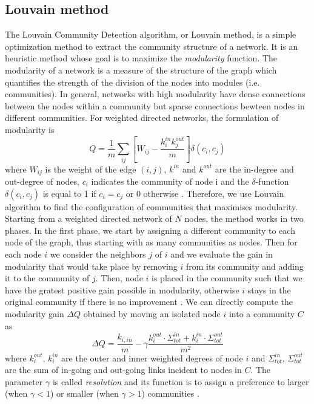 \subsection{Louvain method}

The Louvain Community Detection algorithm, or Louvain method, is a simple optimization method to extract the community structure of a network. It is an heuristic method whose goal is to maximize the \textit{modularity} function. The modularity of a network is a measure of the structure of the graph which quantifies the strength of the division of the nodes into modules (i.e. communities). In general, networks with high modularity have dense connections between the nodes within a community but sparse connections bewteen nodes in different communities.
For weighted directed networks, the formulation of modularity is 
\[
    Q = \frac{1}{m} \sum_{ij} \left[ W_{ij} - \frac{k_i^{in}k_j^{out}}{m} \right] \delta(c_i,c_j)
\]
where $W_{ij}$ is the weight of the edge $(i,j)$, $k^{in}$ and $k^{out}$
are the in-degree and out-degree of nodes, $c_i$ indicates the community of node i and the $\delta$-function $\delta(c_i,c_j)$ is equal to 1 if $c_i=c_j$ or $0$ otherwise \cite{leicht2008community}.
Therefore, we use Louvain algorithm to find the configuration of communities that maximises modularity. Starting from a weighted directed network of $N$ nodes, the method works in two phases. 
In the first phase, we start by assigning a different community to each node of the graph, thus starting with as many communities as nodes. Then for each node $i$ we consider the neighbors $j$ of $i$ and we evaluate the gain in modularity that would take place by removing $i$ from its community and adding it to the community of $j$. Then, node $i$ is placed in the community such that we have the gratest positive gain possible in modularity, otherwise $i$ stays in the original community if there is no improvement \cite{blondel2008louvain}. We can directly compute the modularity gain $\Delta Q$ obtained by moving an isolated node \(i\) into a community \(C\) as
\[
    \Delta Q = \frac{k_{i,in}}{m} - \gamma\frac{k_i^{out} \cdot\Sigma_{tot}^{in} + k_i^{in} \cdot \Sigma_{tot}^{out}}{m^2}
\]
where \(k_i^{out}\), \(k_i^{in}\) are the outer and inner weighted degrees of node \(i\) and \(\Sigma_{tot}^{in}\), \(\Sigma_{tot}^{out}\) are the sum of in-going and out-going links incident to nodes in \(C\).
The parameter $\gamma$ is called \textit{resolution} and its function is to assign a preference to larger (when $\gamma < 1$) or smaller (when $\gamma > 1$) communities \cite{hagberg2008networkx}.
